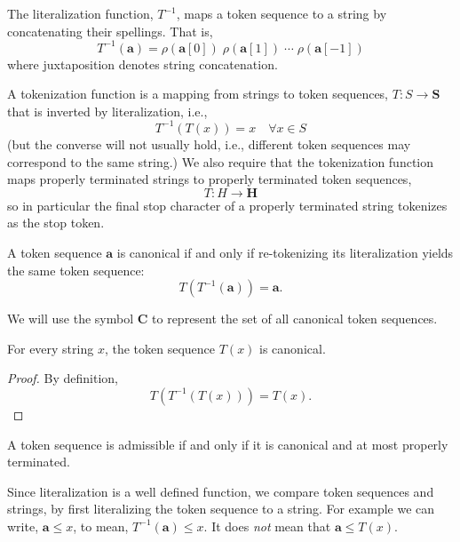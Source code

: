 \begin{definition}
    The literalization function, $T^{-1}$, maps a token sequence to a string by concatenating their spellings.
    That is,
    \[
    T^{-1}(\mathbf{a}) = \rho(\mathbf{a}[0])\;\rho(\mathbf{a}[1])\;\cdots\;\rho(\mathbf{a}[-1])
    \]
    where juxtaposition denotes string concatenation.
\end{definition}

\begin{definition}
    A tokenization function is a mapping from strings to token sequences,
    $T: S \to \mathbf{S}$
    that is inverted by literalization, i.e.,
    $$
    T^{-1}(T(x)) = x \quad \forall x \in S
    $$
    (but the converse will not usually hold, i.e., different token sequences may correspond to the same string.)
    We also require that the tokenization function maps
    properly terminated strings to properly terminated token sequences,
    $$
    T: H \to \mathbf{H}
    $$
    so in particular the final stop character of a properly terminated string
    tokenizes as the stop token.
\end{definition}

\begin{definition}
    A token sequence $\mathbf{a}$ is canonical if and only if re-tokenizing its
    literalization yields the same token sequence:
    \[
    T(T^{-1}(\mathbf{a})) = \mathbf{a}.
    \]
\end{definition}

We will use the symbol $\mathbf{C}$ to represent the set of all canonical token sequences.


\begin{proposition}
\label{prop:tokenizations-are-canonical}
    For every string $x$, the token sequence $T(x)$ is canonical.
\end{proposition}
\begin{proof}
    By definition,
    $$
    T(T^{-1}(T(x))) = T(x).
    $$
\end{proof}

\begin{definition}
    A token sequence is admissible if and only if it is canonical and at most properly terminated.
\end{definition}

\begin{definition}
    Since literalization is a well defined function, we compare token sequences and strings,
    by first literalizing the token sequence to a string.
    For example we can write, $\mathbf{a} \leq x$,
    to mean, $T^{-1}(\mathbf{a}) \leq x$. It does \textit{not} mean that $\mathbf{a} \leq T(x)$.
\end{definition}

